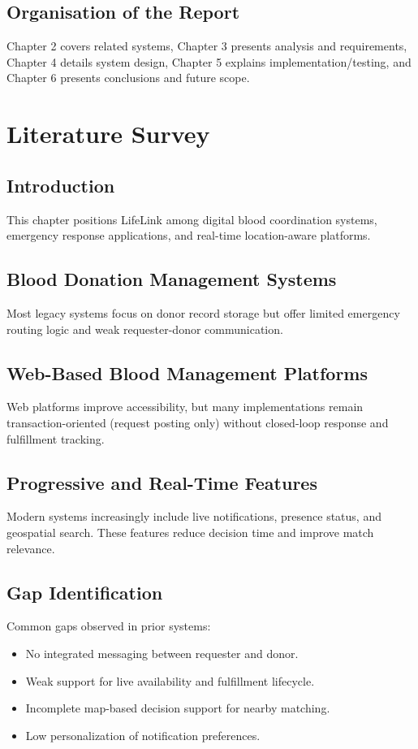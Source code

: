 \documentclass[12pt,a4paper]{report}
\begin{document}
\section{Organisation of the Report}
Chapter 2 covers related systems, Chapter 3 presents analysis and requirements, Chapter 4 details system design, Chapter 5 explains implementation/testing, and Chapter 6 presents conclusions and future scope.

\chapter{Literature Survey}
\section{Introduction}
This chapter positions LifeLink among digital blood coordination systems, emergency response applications, and real-time location-aware platforms.

\section{Blood Donation Management Systems}
Most legacy systems focus on donor record storage but offer limited emergency routing logic and weak requester-donor communication.

\section{Web-Based Blood Management Platforms}
Web platforms improve accessibility, but many implementations remain transaction-oriented (request posting only) without closed-loop response and fulfillment tracking.

\section{Progressive and Real-Time Features}
Modern systems increasingly include live notifications, presence status, and geospatial search. These features reduce decision time and improve match relevance.

\section{Gap Identification}
Common gaps observed in prior systems:
\begin{itemize}[leftmargin=1.5em]
\item No integrated messaging between requester and donor.
\item Weak support for live availability and fulfillment lifecycle.
\item Incomplete map-based decision support for nearby matching.
\item Low personalization of notification preferences.
\end{itemize}
\end{document}
